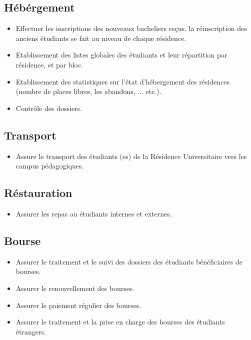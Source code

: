     \subsection*{Hébérgement}
    \begin{itemize}
        \item Effectuer les inscriptions des nouveaux bacheliers reçus. la réinscription des anciens étudiants se fait au niveau de chaque résidence.
        \item Etablissement des listes globales des étudiants et leur répartition par résidence, et par bloc.
        \item Etablissement des statistiques sur l'état d'hébergement des résidences (nombre de places libres, les abandons, ... etc.).
        \item Contrôle des dossiers.
    \end{itemize}

    \subsection*{Transport}
    \begin{itemize}
        \item Assure le transport des étudiants (es) de la Résidence Universitaire vers les campus pédagogiques.
    \end{itemize}

    \subsection*{Réstauration}
    \begin{itemize}
        \item Assurer les repas au étudiants internes et externes.
    \end{itemize}

    \subsection*{Bourse}
    \begin{itemize}
        \item Assurer le traitement et le suivi des dossiers des étudiants bénéficiaires de bourses.
        \item Assurer le renouvellement des bourses.
        \item Assurer le paiement régulier des bourses.
        \item Assurer le traitement et la prise en charge des bourses des étudiants étrangers.
    \end{itemize}

